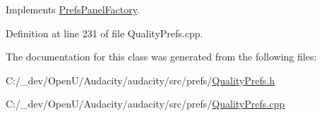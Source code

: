 Implements \hyperlink{class_prefs_panel_factory_a4814184d6050665a43f4929caa73aa0c}{Prefs\+Panel\+Factory}.



Definition at line 231 of file Quality\+Prefs.\+cpp.



The documentation for this class was generated from the following files\+:\begin{DoxyCompactItemize}
\item 
C\+:/\+\_\+dev/\+Open\+U/\+Audacity/audacity/src/prefs/\hyperlink{_quality_prefs_8h}{Quality\+Prefs.\+h}\item 
C\+:/\+\_\+dev/\+Open\+U/\+Audacity/audacity/src/prefs/\hyperlink{_quality_prefs_8cpp}{Quality\+Prefs.\+cpp}\end{DoxyCompactItemize}
